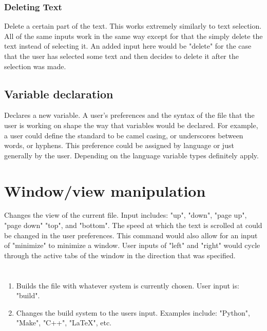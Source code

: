 \documentclass[11pt, oneside]{article}
\begin{document}
	\subsubsection{Deleting Text}
	Delete a certain part of the text. This works extremely similarly to text selection. All of the same inputs work in the same way except for that the simply delete the text instead of selecting it. An added input here would be "delete" for the case that the user has selected some text and then decides to delete it after the selection was made.

	\subsection{Variable declaration}
	Declares a new variable. A user's preferences and the syntax of the file that the user is working on shape the way that variables would be declared. For example, a user could define the standard to be camel casing, or underscores between words, or hyphens. This preference could be assigned by language or just generally by the user. Depending on the language variable types definitely apply.


\section{Window/view manipulation}

	Changes the view of the current file. Input includes: "up", "down", "page up", "page down" "top", and "bottom". The speed at which the text is scrolled at could be changed in the user preferences. This command would also allow for an input of "minimize" to minimize a window. User inputs of "left" and "right" would cycle through the active tabs of the window in the direction that was specified.

\section{}

	\begin{enumerate}
	\item {}
	Builds the file with whatever system is currently chosen. User input is: "build".

	\item {}
	Changes the build system to the users input. Examples include: "Python", "Make", "C++", "\LaTeX", etc.
	\end{enumerate}
\end{document}
